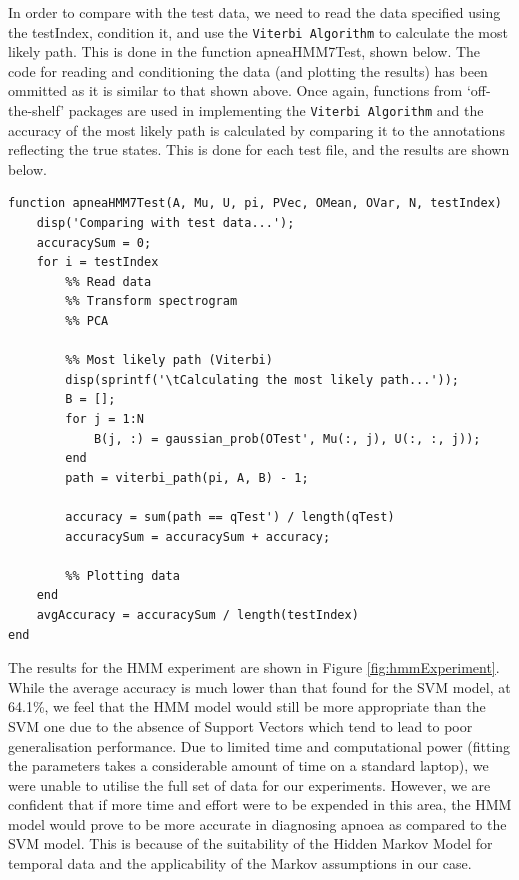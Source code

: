 In order to compare with the test data, we need to read the data specified using the testIndex, condition it, and use the \verb!Viterbi Algorithm! to calculate the most likely path. This is done in the function apneaHMM7Test, shown below. The code for reading and conditioning the data (and plotting the results) has been ommitted as it is similar to that shown above. Once again, functions from `off-the-shelf' packages are used in implementing the \verb!Viterbi Algorithm! and the accuracy of the most likely path is calculated by comparing it to the annotations reflecting the true states. This is done for each test file, and the results are shown below.  

\begin{lstlisting}
function apneaHMM7Test(A, Mu, U, pi, PVec, OMean, OVar, N, testIndex)
    disp('Comparing with test data...');
    accuracySum = 0;
    for i = testIndex
        %% Read data
        %% Transform spectrogram
        %% PCA

        %% Most likely path (Viterbi)
        disp(sprintf('\tCalculating the most likely path...'));
        B = [];
        for j = 1:N
            B(j, :) = gaussian_prob(OTest', Mu(:, j), U(:, :, j));
        end
        path = viterbi_path(pi, A, B) - 1;
        
        accuracy = sum(path == qTest') / length(qTest)
        accuracySum = accuracySum + accuracy;
        
        %% Plotting data
    end
    avgAccuracy = accuracySum / length(testIndex)
end
\end{lstlisting}

The results for the HMM experiment are shown in Figure \ref{fig:hmmExperiment}. While the average accuracy is much lower than that found for the SVM model, at 64.1\%, we feel that the HMM model would still be more appropriate than the SVM one due to the absence of Support Vectors which tend to lead to poor generalisation performance. Due to limited time and computational power (fitting the parameters takes a considerable amount of time on a standard laptop), we were unable to utilise the full set of data for our experiments. However, we are confident that if more time and effort were to be expended in this area, the HMM model would prove to be more accurate in diagnosing apnoea as compared to the SVM model. This is because of the suitability of the Hidden Markov Model for temporal data and the applicability of the Markov assumptions in our case.

